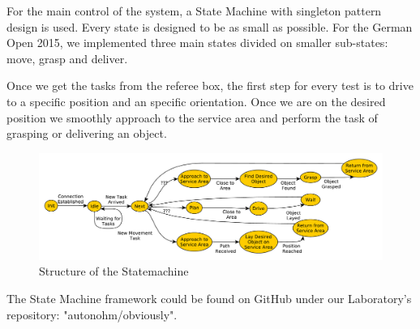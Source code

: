For the main control of the system, a State Machine with singleton pattern design is used. Every state is designed to be as small as possible. For the German Open 2015, we implemented three main states divided on smaller sub-states: move, grasp and deliver.

Once we get the tasks from the referee box, the first step for every test is to drive to a specific position and an specific orientation. Once we are on the desired position we smoothly approach to the service area and perform the task of grasping or delivering an object. 	


\begin{figure}[htbp]
	\centering
	\includegraphics[width=\textwidth]{img/sm}
	\caption{Structure of the Statemachine}
	\label{fig:SM}
\end{figure}


The State Machine framework could be found on GitHub under our Laboratory's repository: "autonohm/obviously". 